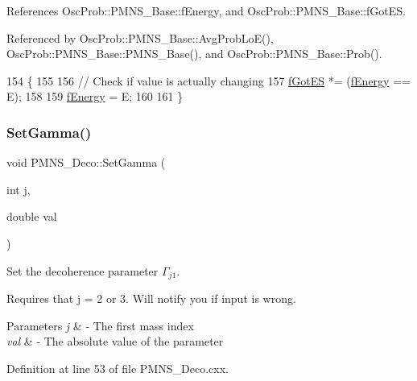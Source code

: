 References Osc\+Prob\+::\+P\+M\+N\+S\+\_\+\+Base\+::f\+Energy, and Osc\+Prob\+::\+P\+M\+N\+S\+\_\+\+Base\+::f\+Got\+ES.



Referenced by Osc\+Prob\+::\+P\+M\+N\+S\+\_\+\+Base\+::\+Avg\+Prob\+Lo\+E(), Osc\+Prob\+::\+P\+M\+N\+S\+\_\+\+Base\+::\+P\+M\+N\+S\+\_\+\+Base(), and Osc\+Prob\+::\+P\+M\+N\+S\+\_\+\+Base\+::\+Prob().


\begin{DoxyCode}
154 \{
155 
156   \textcolor{comment}{// Check if value is actually changing}
157   \hyperlink{classOscProb_1_1PMNS__Base_a6dc5cd010d2d70b2324745b4e53e9839}{fGotES} *= (\hyperlink{classOscProb_1_1PMNS__Base_a2800af6d436972f3e900867790c046b0}{fEnergy} == E);
158 
159   \hyperlink{classOscProb_1_1PMNS__Base_a2800af6d436972f3e900867790c046b0}{fEnergy} = E;
160 
161 \}
\end{DoxyCode}
\mbox{\label{classOscProb_1_1PMNS__Deco_ac06a9c503d1c5b4a43c4eb797881898d}} 
\subsubsection{\texorpdfstring{Set\+Gamma()}{SetGamma()}}
{\footnotesize\ttfamily void P\+M\+N\+S\+\_\+\+Deco\+::\+Set\+Gamma (\begin{DoxyParamCaption}\item[{int}]{j,  }\item[{double}]{val }\end{DoxyParamCaption})\hspace{0.3cm}{\ttfamily [virtual]}}

Set the decoherence parameter $\Gamma_{j1}$.

Requires that j = 2 or 3. Will notify you if input is wrong.


\begin{DoxyParams}{Parameters}
{\em j} & -\/ The first mass index \\
\hline
{\em val} & -\/ The absolute value of the parameter \\
\hline
\end{DoxyParams}


Definition at line 53 of file P\+M\+N\+S\+\_\+\+Deco.\+cxx.



